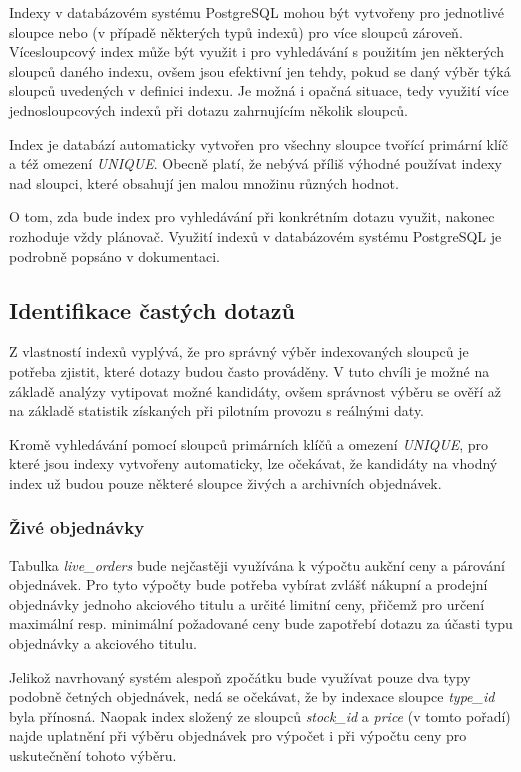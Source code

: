 \documentclass[thesis=M,czech]{FITthesis}[2012/06/26]
\begin{document}
Indexy v databázovém systému PostgreSQL mohou být vytvořeny pro jednotlivé sloupce nebo (v případě některých typů indexů) pro více sloupců zároveň. 
Vícesloupcový index může být využit i pro vyhledávání s použitím jen některých sloupců daného indexu, ovšem jsou efektivní jen tehdy, pokud se daný výběr 
týká  sloupců uvedených v definici indexu. Je možná i opačná situace, tedy využití více jednosloupcových indexů při dotazu zahrnujícím několik sloupců.

Index je databází automaticky vytvořen pro všechny sloupce tvořící primární klíč a též omezení \textit{UNIQUE}. Obecně platí, že nebývá příliš výhodné 
používat indexy nad sloupci, které obsahují jen malou množinu různých hodnot.

O tom, zda bude index pro vyhledávání při konkrétním dotazu využit, nakonec rozhoduje vždy plánovač. Využití indexů v databázovém systému PostgreSQL 
je podrobně popsáno v dokumentaci. \cite{pgdoc}


\subsection{Identifikace častých dotazů}

Z vlastností indexů vyplývá, že pro správný výběr indexovaných sloupců je potřeba zjistit, které dotazy budou často prováděny. V tuto chvíli je možné na 
základě analýzy vytipovat možné kandidáty, ovšem správnost výběru se ověří až na základě statistik získaných při pilotním provozu s reálnými daty.

Kromě vyhledávání pomocí sloupců primárních klíčů a omezení \textit{UNIQUE}, pro které jsou indexy vytvořeny automaticky, lze očekávat, že kandidáty 
na vhodný index už budou pouze některé sloupce živých a archivních objednávek. 

\subsubsection{Živé objednávky}

Tabulka \textit{live\_orders} bude nejčastěji využívána k výpočtu aukční ceny a párování objednávek. Pro tyto výpočty bude potřeba vybírat zvlášť nákupní 
a prodejní objednávky jednoho akciového titulu a určité limitní ceny, přičemž pro určení maximální resp. minimální požadované ceny bude zapotřebí 
dotazu za účasti typu objednávky a akciového titulu. 

Jelikož navrhovaný systém alespoň zpočátku bude využívat pouze dva typy podobně četných 
objednávek, nedá se očekávat, že by indexace sloupce \textit{type\_id} byla přínosná. Naopak index složený ze sloupců \textit{stock\_id} a 
\textit{price} (v tomto pořadí) najde uplatnění při výběru objednávek pro výpočet i při výpočtu ceny pro uskutečnění tohoto výběru.
\end{document}
